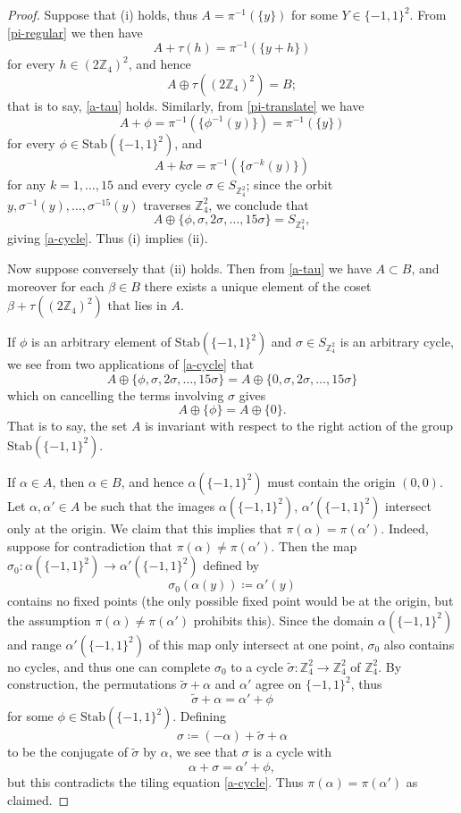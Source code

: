 \documentclass[reqno,a4paper,12pt]{amsart}
\numberwithin{equation}{section}
\numberwithin{figure}{section}
\def\Z{\mathbb{Z}}
\theoremstyle{plain}
\theoremstyle{definition}
\begin{document}
\begin{proof}  Suppose that (i) holds, thus $A = \pi^{-1}(\{y\})$ for some $Y \in \{-1,1\}^2$.  From \eqref{pi-regular} we then have
$$ A + \tau(h) = \pi^{-1}(\{y+h\})
$$
for every $h \in (2\Z_4)^2$, and hence
$$ A \oplus \tau((2\Z_4)^2) = B;$$
that is to say, \eqref{a-tau} holds.  Similarly, from \eqref{pi-translate} we have
$$ A + \phi = \pi^{-1}(\{\phi^{-1}(y)\}) = \pi^{-1}(\{y\})$$
for every $\phi \in \mathrm{Stab}(\{-1,1\}^2)$, and
$$ A + k \sigma = \pi^{-1}(\{\sigma^{-k}(y)\})$$
for any $k=1,\dots,15$ and every cycle $\sigma \in S_{\Z_4^2}$; since the orbit $y, \sigma^{-1}(y),\dots,\sigma^{-15}(y)$ traverses $\Z_4^2$, we conclude that
$$ A \oplus  \{ \phi, \sigma, 2\sigma, \dots, 15 \sigma\} = S_{\Z_4^2},$$
giving \eqref{a-cycle}.  Thus (i) implies (ii).  

Now suppose conversely that (ii) holds.  Then from \eqref{a-tau} we have $A \subset B$, and moreover for each $\beta \in B$ there exists a unique element of the coset $\beta + \tau((2\Z_4)^2)$  that lies in $A$.

If $\phi$ is an arbitrary element of $\mathrm{Stab}(\{-1,1\}^2)$ and $\sigma \in S_{\Z_4^2}$ is an arbitrary cycle, we see from two applications of \eqref{a-cycle} that
$$ A \oplus \{ \phi, \sigma,2\sigma,\dots,15 \sigma\} = A \oplus \{ 0, \sigma,2\sigma,\dots,15 \sigma\}$$
which on cancelling the terms involving $\sigma$ gives
$$ A \oplus \{\phi\} = A \oplus \{0\}.$$
That is to say, the set $A$ is invariant with respect to the right action of the group $\mathrm{Stab}(\{-1,1\}^2)$.

If $\alpha \in A$, then $\alpha \in B$, and hence $\alpha(\{-1,1\}^2)$ must contain the origin $(0,0)$.  Let $\alpha, \alpha' \in A$ be such that the images $\alpha(\{-1,1\}^2)$, $\alpha'(\{-1,1\}^2)$ intersect only at the origin.  We claim that this implies that $\pi(\alpha)=\pi(\alpha')$.  Indeed, suppose for contradiction that $\pi(\alpha) \neq \pi(\alpha')$.  Then the map $\sigma_0 \colon \alpha(\{-1,1\}^2) \to \alpha'(\{-1,1\}^2)$ defined by
$$ \sigma_0(\alpha(y)) \coloneqq \alpha'(y)$$
contains no fixed points (the only possible fixed point would be at the origin, but the assumption $\pi(\alpha) \neq \pi(\alpha')$ prohibits this).  Since the domain $\alpha(\{-1,1\}^2)$ and range $\alpha'(\{-1,1\}^2)$ of this map only intersect at one point, $\sigma_0$ also contains no cycles, and thus one can complete $\sigma_0$ to a cycle $\tilde \sigma \colon \Z_4^2 \to \Z_4^2$ of $\Z_4^2$.  By construction, the permutations $\tilde \sigma + \alpha$ and $\alpha'$ agree on $\{-1,1\}^2$, thus
$$ \tilde \sigma + \alpha = \alpha' + \phi$$
for some $\phi \in \mathrm{Stab}(\{-1,1\}^2)$.  Defining 
$$ \sigma \coloneqq (-\alpha) + \tilde \sigma + \alpha$$
to be the conjugate of $\tilde \sigma$ by $\alpha$, we see that $\sigma$ is a cycle with
$$ \alpha + \sigma = \alpha' + \phi,$$
but this contradicts the tiling equation \eqref{a-cycle}.  Thus $\pi(\alpha)=\pi(\alpha')$ as claimed.


\end{proof}
\end{document}
